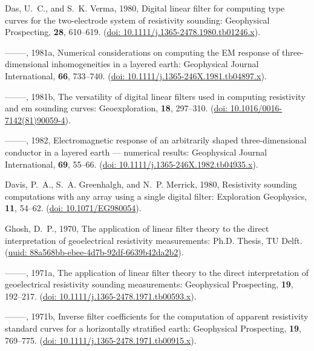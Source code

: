 \documentclass[paper,twocolumn,twoside]{geophysics}
\begin{document}
\begin{thebibliography}{}
Das, U.~C., and S.~K. Verma,  1980, Digital linear filter for computing type
  curves for the two-electrode system of resistivity sounding: Geophysical
  Prospecting, {\bf 28}, 610--619.
\newblock (\href{https://doi.org/10.1111/j.1365-2478.1980.tb01246.x}{doi:
  10.1111/j.1365-2478.1980.tb01246.x}).

--------, 1981a, Numerical considerations on computing the {EM} response of
  three-dimensional inhomogeneities in a layered earth: Geophysical Journal
  International, {\bf 66}, 733--740.
\newblock (\href{https://doi.org/10.1111/j.1365-246X.1981.tb04897.x}{doi:
  10.1111/j.1365-246X.1981.tb04897.x}).

--------, 1981b, The versatility of digital linear filters used in computing
  resistivity and em sounding curves: Geoexploration, {\bf 18}, 297--310.
\newblock (\href{https://doi.org/10.1016/0016-7142(81)90059-4}{doi:
  10.1016/0016-7142(81)90059-4}).

--------, 1982, Electromagnetic response of an arbitrarily shaped
  three-dimensional conductor in a layered earth — numerical results:
  Geophysical Journal International, {\bf 69}, 55--66.
\newblock (\href{https://doi.org/10.1111/j.1365-246X.1982.tb04935.x}{doi:
  10.1111/j.1365-246X.1982.tb04935.x}).

Davis, P.~A., S.~A. Greenhalgh, and N.~P. Merrick,  1980, Resistivity sounding
  computations with any array using a single digital filter: Exploration
  Geophysics, {\bf 11}, 54--62.
\newblock (\href{https://doi.org/10.1071/EG980054}{doi: 10.1071/EG980054}).

Ghosh, D.~P.,  1970, The application of linear filter theory to the direct
  interpretation of geoelectrical resistivity measurements: {Ph.D. Thesis}, {TU
  Delft}.
\newblock
  (\href{http://resolver.tudelft.nl/uuid:88a568bb-ebee-4d7b-92df-6639b42da2b2}{uuid:
  88a568bb-ebee-4d7b-92df-6639b42da2b2}).

--------, 1971a, The application of linear filter theory to the direct
  interpretation of geoelectrical resistivity sounding measurements:
  Geophysical Prospecting, {\bf 19}, 192--217.
\newblock (\href{https://doi.org/10.1111/j.1365-2478.1971.tb00593.x}{doi:
  10.1111/j.1365-2478.1971.tb00593.x}).

--------, 1971b, Inverse filter coefficients for the computation of apparent
  resistivity standard curves for a horizontally stratified earth: Geophysical
  Prospecting, {\bf 19}, 769--775.
\newblock (\href{https://doi.org/10.1111/j.1365-2478.1971.tb00915.x}{doi:
  10.1111/j.1365-2478.1971.tb00915.x}).


\end{thebibliography}
\end{document}
